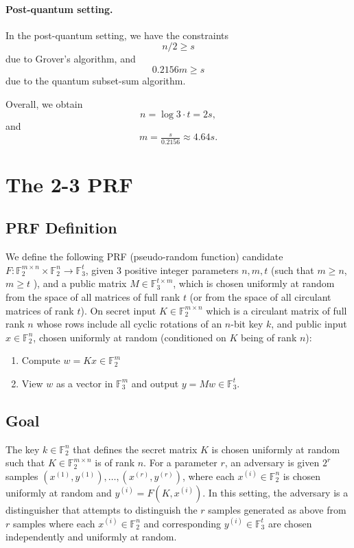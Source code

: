\documentclass{article}
\begin{document}
\paragraph{Post-quantum setting.}
In the post-quantum setting, we have the constraints
$$n/2 \geq s$$
due to Grover's algorithm, and
$$0.2156 m \geq s$$
due to the quantum subset-sum algorithm.

Overall, we obtain
$$n = \log 3 \cdot t = 2s,$$
and $$m = \tfrac{s}{0.2156} \approx 4.64 s.$$

\section{The 2-3 PRF}

\subsection{PRF Definition}

We define the following PRF (pseudo-random function) candidate
$F: \mathbb{F}_2^{m \times n} \times \mathbb{F}_2^n \rightarrow \mathbb{F}_3^t$,
given 3 positive integer parameters $n,m,t$ (such that $m \geq n$, $m \geq t$ ), and a public matrix
$M \in \mathbb{F}_3^{t \times m}$, which is chosen uniformly at random from the space
of all matrices of full rank $t$ (or from the space of all circulant matrices of rank $t$).
On secret input $K \in \mathbb{F}_2^{m \times n}$ which is a circulant matrix of full rank $n$
whose rows include all cyclic rotations of an $n$-bit key $k$, and
public input $x \in \mathbb{F}_2^n$, chosen uniformly at random (conditioned on $K$ being of rank $n$):
\begin{enumerate}
  \item Compute $w = Kx \in \mathbb{F}_2^m$
  \item View $w$ as a vector in $\mathbb{F}_3^m$ and output $y = Mw \in \mathbb{F}_3^t$.
\end{enumerate}


\subsection{Goal}

The key $k \in \mathbb{F}_2^n$ that defines the secret matrix $K$ is chosen uniformly at random such that
$K \in \mathbb{F}_2^{m \times n}$ is of rank $n$.
For a parameter $r$, an adversary is given $2^{r}$ samples $(x^{(1)},y^{(1)}) ,\ldots, (x^{(r)},y^{(r)})$, where each $x^{(i)} \in \mathbb{F}_2^n$ is chosen uniformly at random and $y^{(i)} = F(K,x^{(i)})$. In this setting, the adversary is a distinguisher that attempts to distinguish the $r$ samples generated as above from $r$ samples where each $x^{(i)} \in \mathbb{F}_2^n$ and corresponding $y^{(i)} \in \mathbb{F}_3^t$ are chosen independently and uniformly at random.
\end{document}
